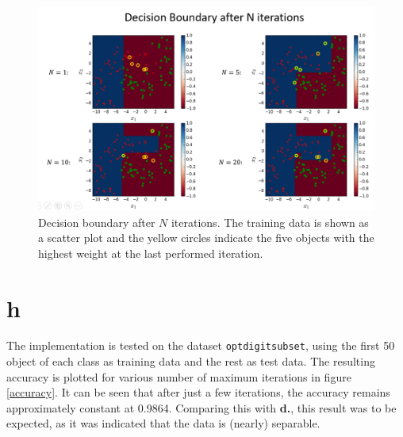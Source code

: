 \documentclass [a4paper] {report}
\begin{document}
	\begin{figure}[H]
		\includegraphics[width = \textwidth]{Images/decision_boundary2.png}
		\caption{Decision boundary after $N$ iterations. The training data is shown as a scatter plot and the yellow circles indicate the five objects with the highest weight at the last performed iteration.}
		\label{decision_boundary2}
	\end{figure}
	
	\section*{h}
	The implementation is tested on the dataset \texttt{optdigitsubset}, using the first 50 object of each class as training data and the rest as test data. The resulting accuracy is plotted for various number of maximum iterations in figure \ref{accuracy}. It can be seen that after just a few iterations, the accuracy remains approximately constant at 0.9864. Comparing this with \textbf{d.}, this result was to be expected, as it was indicated that the data is (nearly) separable.
	
\end{document}

